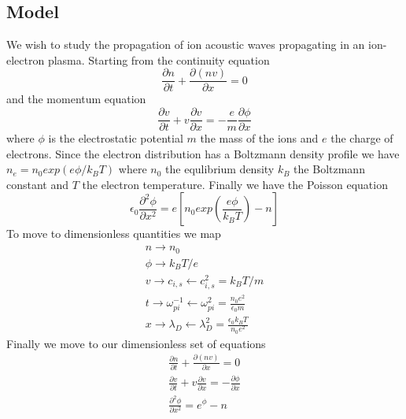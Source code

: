 \documentclass{article}
\begin{document}
\subsection{Model}
We wish to study the propagation of ion acoustic waves propagating in an ion-electron plasma.
Starting from the continuity equation
\begin{equation} \label{Model:continuity}
\frac{\partial n}{\partial t} + \frac{\partial (n v)}{\partial x} = 0
\end{equation}
and the momentum equation
\begin{equation} \label{Model:momentum}
\frac{\partial v}{\partial t} + v \frac{\partial v}{\partial x} = - \frac{e}{m} \frac{\partial \phi}{\partial x}
\end{equation}
where $\phi$ is the electrostatic potential $m$ the mass of the ions and $e$ the charge of electrons.
Since the electron distribution has a Boltzmann density profile we have $n_e = n_0 exp(e\phi/k_B T)$ where $n_0$ the
equlibrium density $k_B$ the Boltzmann constant and $T$ the electron temperature.
Finally we have the Poisson equation
\begin{equation} \label{Model:poisson}
\epsilon_0 \frac{\partial^2 \phi}{\partial x^2} = e \left[ n_0 exp\left(\frac{e \phi}{k_B T}\right) - n \right]
\end{equation}
To move to dimensionless quantities we map
\begin{equation} \label{Model:scaling}
\begin{aligned}
	n \rightarrow n_0 \\
	\phi \rightarrow k_B T/e \\
	v \rightarrow c_{i,s} \leftarrow  c_{i,s}^2 = k_B T/m \\
	t \rightarrow \omega_{pi}^{-1} \leftarrow \omega_{pi}^{2} = \frac{n_0 e^2}{\epsilon_0 m} \\
	x \rightarrow \lambda_D \leftarrow \lambda_D^2 = \frac{\epsilon_0 k_B T}{n_0 e^2}
\end{aligned}
\end{equation}
Finally we move to our dimensionless set of equations
\begin{equation} \label{Modem:systemnodim}
\begin{aligned}
	\frac{\partial n}{\partial t} + \frac{\partial (n v)}{\partial x} = 0 \\
	\frac{\partial v}{\partial t} + v \frac{\partial v}{\partial x} = -\frac{\partial \phi}{\partial x} \\
	\frac{\partial^2 \phi}{\partial x^2} = e^{\phi} - n
\end{aligned}
\end{equation}
\end{document}
